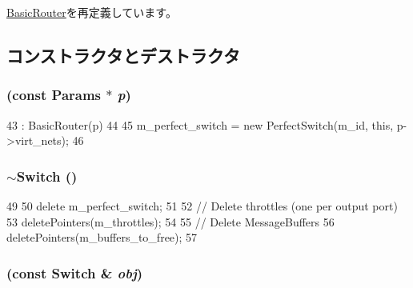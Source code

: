 \hyperlink{classBasicRouter_af2c419269bc768b96a7bae9bfbcd3e94}{BasicRouter}を再定義しています。

\subsection{コンストラクタとデストラクタ}
\hypertarget{classSwitch_a7427cd58b757e55fe72f45e0c3f32faa}{
\subsubsection[{Switch}]{ (const {\bf Params} $\ast$ {\em p})}}
\label{classSwitch_a7427cd58b757e55fe72f45e0c3f32faa}



\begin{DoxyCode}
43                               : BasicRouter(p)
44 {
45     m_perfect_switch = new PerfectSwitch(m_id, this, p->virt_nets);
46 }
\end{DoxyCode}
\hypertarget{classSwitch_a0b78f1267b509f8f56be95957aadce72}{
\subsubsection[{$\sim$Switch}]{\setlength{\rightskip}{0pt plus 5cm}$\sim${\bf Switch} ()}}
\label{classSwitch_a0b78f1267b509f8f56be95957aadce72}



\begin{DoxyCode}
49 {
50     delete m_perfect_switch;
51 
52     // Delete throttles (one per output port)
53     deletePointers(m_throttles);
54 
55     // Delete MessageBuffers
56     deletePointers(m_buffers_to_free);
57 }
\end{DoxyCode}
\hypertarget{classSwitch_a2c5113fd7347a61a5dcbdae8c7222338}{
\subsubsection[{Switch}]{ (const {\bf Switch} \& {\em obj})}}
\label{classSwitch_a2c5113fd7347a61a5dcbdae8c7222338}


